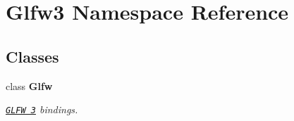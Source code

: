 \hypertarget{namespace_glfw3}{}\section{Glfw3 Namespace Reference}
\label{namespace_glfw3}
\subsection*{Classes}
\begin{DoxyCompactItemize}
\item 
class {\bfseries Glfw}
\begin{DoxyCompactList}\small\item\em \href{http://www.glfw.org/}{\tt G\+L\+FW 3} bindings. \end{DoxyCompactList}\end{DoxyCompactItemize}
